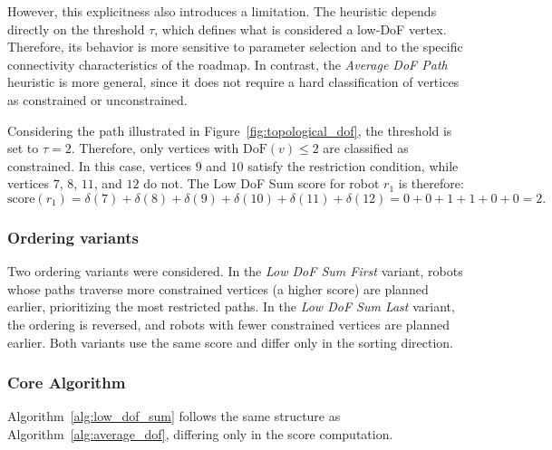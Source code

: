 However, this explicitness also introduces a limitation. The heuristic depends directly on the threshold $\tau$, which defines what is considered a low-DoF vertex. Therefore, its behavior is more sensitive to parameter selection and to the specific connectivity characteristics of the roadmap. In contrast, the \textit{Average DoF Path} heuristic is more general, since it does not require a hard classification of vertices as constrained or unconstrained. 

Considering the path illustrated in Figure~\ref{fig:topological_dof}, the threshold is set to $\tau = 2$. Therefore, only vertices with $\mathrm{DoF}(v) \leq 2$ are classified as constrained. In this case, vertices $9$ and $10$ satisfy the restriction condition, while vertices $7$, $8$, $11$, and $12$ do not. The Low DoF Sum score for robot $r_1$ is therefore:
\[
    \mathrm{score}(r_1) =
    \delta(7) +
    \delta(8) +
    \delta(9) +
    \delta(10) +
    \delta(11) +
    \delta(12)
    = 0 + 0 + 1 + 1 + 0 + 0 = 2.
\]

\subsubsection{Ordering variants}
\label{subsubsec:low_dof_sum_ordering_variants}
\hspace{\parindent}
Two ordering variants were considered. In the \textit{Low DoF Sum First} variant, robots whose paths traverse more constrained vertices (a higher score) are planned earlier, prioritizing the most restricted paths. In the \textit{Low DoF Sum Last} variant, the ordering is reversed, and robots with fewer constrained vertices are planned earlier. Both variants use the same score and differ only in the sorting direction.

\subsubsection{Core Algorithm}
\label{subsubsec:low_dof_sum_pseudocode}
\hspace{\parindent}
Algorithm~\ref{alg:low_dof_sum} follows the same structure as Algorithm~\ref{alg:average_dof}, differing only in the score computation.

